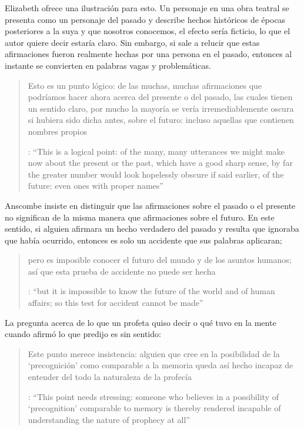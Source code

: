 Elizabeth ofrece una ilustración para esto. Un personaje en una obra teatral se presenta como un personaje del pasado y describe hechos históricos de épocas posteriores a la suya y que nosotros conocemos, el efecto sería ficticio, lo que el autor quiere decir estaría claro. Sin embargo, si sale a relucir que estas afirmaciones fueron realmente hechas por una persona en el pasado, entonces al instante se convierten en palabras vagas y problemáticas. \blockquote[{\cite[31]{anscombe2008faith:prophandmi}}: \enquote{This is a logical point: of the many, many utterances we might make now about the present or the past, which have a good sharp sense, by far the greater number would look hopelessly obscure if said earlier, of the future: even ones with proper names}]{Esto es un punto lógico: de las muchas, muchas afirmaciones que podríamos hacer ahora acerca del presente o del pasado, las cuales tienen un sentido claro, por mucho la mayoría se vería irremediablemente oscura si hubiera sido dicha antes, sobre el futuro: incluso aquellas que contienen nombres propios} Anscombe insiste en distinguir que las afirmaciones sobre el pasado o el presente no significan de la misma manera que afirmaciones sobre el futuro. En este sentido, si alguien afirmara un hecho verdadero del pasado y resulta que ignoraba que había ocurrido, entonces es solo un accidente que sus palabras aplicaran; \blockquote[{\cite[29]{anscombe2008faith:prophandmi}}: \enquote{but it is impossible to know the future of the world and of human affairs; so this test for accident cannot be made}]{pero es imposible conocer el futuro del mundo y de los asuntos humanos; así que esta prueba de accidente no puede ser hecha}. La pregunta acerca de lo que un profeta quiso decir o qué tuvo en la mente cuando afirmó lo que predijo es sin sentido: \blockquote[{\cite[29]{anscombe2008faith:prophandmi}}: \enquote{This point needs stressing: someone who believes in a possibility of `precognition' comparable to memory is thereby rendered incapable of understanding the nature of prophecy at all}]{Este punto merece insistencia: alguien que cree en la posibilidad de la `precognición' como comparable a la memoria queda así hecho incapaz de entender del todo la naturaleza de la profecía}.

